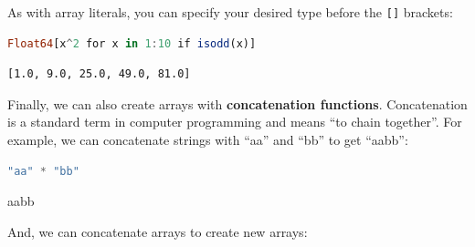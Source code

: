 \documentclass[
  notoc %
]{tufte-book}
\newcommand{\passthrough}[1]{#1}
\begin{document}
As with array literals, you can specify your desired type before the
\passthrough{\lstinline![]!} brackets:

\begin{lstlisting}[language=Julia]
Float64[x^2 for x in 1:10 if isodd(x)]
\end{lstlisting}

\begin{lstlisting}[language=Output]
[1.0, 9.0, 25.0, 49.0, 81.0]
\end{lstlisting}

Finally, we can also create arrays with \textbf{concatenation
functions}. Concatenation is a standard term in computer programming and
means ``to chain together''. For example, we can concatenate strings
with ``aa'' and ``bb'' to get ``aabb'':

\begin{lstlisting}[language=Julia]
"aa" * "bb"
\end{lstlisting}

aabb

And, we can concatenate arrays to create new arrays:
\end{document}
